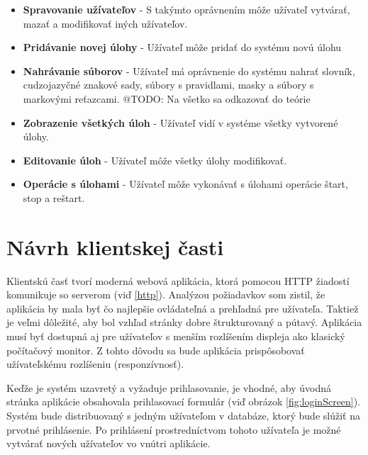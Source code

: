\documentclass[slovak]{fitthesis}
\begin{document}
\begin{itemize}
    \item \textbf{Spravovanie užívateľov} - S takýmto oprávnením môže užívateľ vytvárať, mazať a modifikovať iných užívateľov.
    \item \textbf{Pridávanie novej úlohy} - Užívateľ môže pridať do systému novú úlohu
    \item \textbf{Nahrávanie súborov} - Užívateľ má oprávnenie do systému nahrať slovník, cudzojazyčné znakové sady, súbory s pravidlami, masky a súbory s markovými reťazcami. @TODO: Na všetko sa odkazovať do teórie
    \item \textbf{Zobrazenie všetkých úloh} - Užívateľ vidí v systéme všetky vytvorené úlohy.
    \item \textbf{Editovanie úloh} - Užívateľ môže všetky úlohy modifikovať.
    \item \textbf{Operácie s úlohami} - Užívateľ môže vykonávať s úlohami operácie štart, stop a reštart.
\end{itemize}





\section{Návrh klientskej časti}\label{navrhKlient}
Klientskú časť tvorí moderná webová aplikácia, ktorá pomocou HTTP žiadostí komunikuje so serverom (viď \ref{http}). Analýzou požiadavkov som zistil, že aplikácia by mala byť čo najlepšie ovládateľná a prehľadná pre užívateľa. Taktiež je veľmi dôležité, aby bol vzhľad stránky dobre štrukturovaný a pútavý. Aplikácia musí byť dostupná aj pre užívateľov s menším rozlíšením displeja ako klasický počítačový monitor. Z tohto dôvodu sa bude aplikácia prispôsobovať užívateľskému rozlíšeniu (responzívnosť).

Keďže je systém uzavretý a vyžaduje prihlasovanie, je vhodné, aby úvodná stránka aplikácie obsahovala prihlasovací formulár (viď obrázok \ref{fig:loginScreen}). Systém bude distribuovaný s jedným užívateľom v databáze, ktorý bude slúžiť na prvotné prihlásenie. Po prihlásení prostredníctvom tohoto užívateľa je možné vytvárať nových užívateľov vo vnútri aplikácie.
\end{document}
